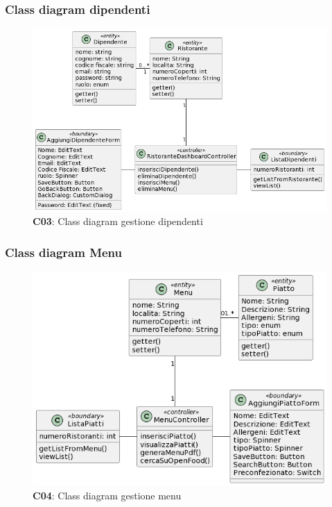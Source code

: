     \subsubsection{Class diagram dipendenti}
        \begin{figure}[H]
            \centering
            \includegraphics[scale=0.5]{assets/diagrammi/Class diagram di analisi/Gestione dipendenti.png}
            \caption{\textbf{C03}: Class diagram gestione dipendenti}\label{fig:Dipendenti}
        \end{figure}
    
    \subsubsection{Class diagram Menu}
        \begin{figure}[H]
            \centering
            \includegraphics[scale=0.5]{assets/diagrammi/Class diagram di analisi/Gestione menu.png}
            \caption{\textbf{C04}: Class diagram gestione menu}\label{fig:Menu}
        \end{figure} 

